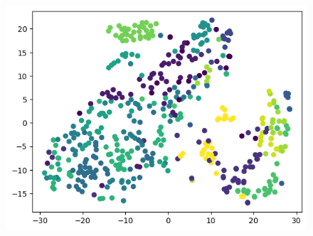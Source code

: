 \begin{figure}[htbp]
{\begin{minipage}[b]{.48\linewidth}
\end{minipage}
\begin{minipage}[b]{.48\linewidth}
\centering
\includegraphics[scale=0.2]{cluster/shibainu-rara_sc.png}
\end{minipage}
}
\end{figure}
